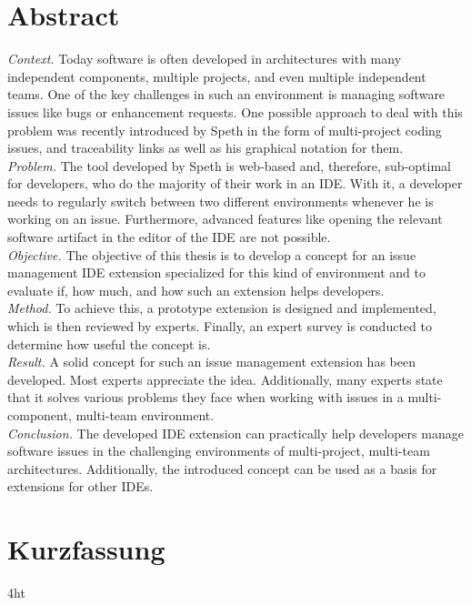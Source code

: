\documentclass[
  a4paper,  %
  twoside,  %
  bibliography=totoc,
  headsepline,
  cleardoublepage=empty,
  parskip=half,
  draft=false
]{scrbook}
\begin{document}
\section*{Abstract}
\textit{Context.} Today software is often developed in architectures with many independent components, multiple projects, and even multiple independent teams. 
One of the key challenges in such an environment is managing software issues like bugs or enhancement requests. 
One possible approach to deal with this problem was recently introduced by Speth in the form of multi-project coding issues, and traceability links
as well as his graphical notation for them. \\
\textit{Problem.} The tool developed by Speth is web-based and, therefore, sub-optimal for developers, 
who do the majority of their work in an \gls{IDE}. 
With it, a developer needs to regularly switch between two different environments whenever he is working on an issue. 
Furthermore, advanced features like opening the relevant software artifact in the editor of the \gls{IDE} are not possible. \\
\textit{Objective.} The objective of this thesis is to develop a concept for an issue management \gls{IDE} extension specialized for this kind of environment and to evaluate if, how much, and how such an extension helps developers. \\
\textit{Method.} To achieve this, a prototype extension is designed and implemented, which is then reviewed by experts.
Finally, an expert survey is conducted to determine how useful the concept is.\\
\textit{Result.} A solid concept for such an issue management extension has been developed. 
Most experts appreciate the idea. Additionally, many experts state that it solves various problems they face when working with issues in a multi-component, multi-team environment.\\
\textit{Conclusion.} The developed \gls{IDE} extension can practically help developers manage software issues in the challenging environments of multi-project, multi-team architectures. Additionally, the introduced concept can be used as a basis for extensions for other \glspl{IDE}.
\cleardoublepage

\section*{Kurzfassung}
\lipsum[2-2]
\cleardoublepage

\iftex4ht
\else
\fi
\end{document}
